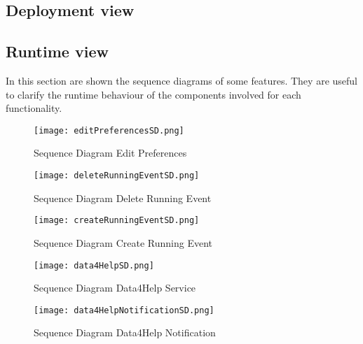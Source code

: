 \documentclass[../main.tex]{subfiles}
\begin{document}
\subsection{Deployment view}

\subsection{Runtime view}
In this section are shown the sequence diagrams of some features. They are useful to clarify the runtime behaviour of the components involved for each functionality.
\begin{figure}[H]
        \centering
             \texttt{[image: editPreferencesSD.png]}
              \caption{Sequence Diagram Edit Preferences }
               \label{fig:editPreferencesSD}
\end{figure}

\vspace*{2cm}

\begin{figure}[H]
        \centering
             \texttt{[image: deleteRunningEventSD.png]}
              \caption{Sequence Diagram Delete Running Event }
               \label{fig:deleteRunningEventSD}
\end{figure}

\vspace*{2cm}

\begin{figure}[H]
        \centering
             \texttt{[image: createRunningEventSD.png]}
              \caption{Sequence Diagram Create Running Event }
               \label{fig:createRunningEventSD}
\end{figure}

\vspace*{2cm}

\begin{figure}[H]
        \centering
             \texttt{[image: data4HelpSD.png]}
              \caption{Sequence Diagram Data4Help Service }
               \label{fig:data4HelpSD}
\end{figure}

\vspace*{2cm}

\begin{figure}[H]
        \centering
             \texttt{[image: data4HelpNotificationSD.png]}
              \caption{Sequence Diagram Data4Help Notification  }
               \label{fig:data4HelpSD}
\end{figure}
\end{document}
